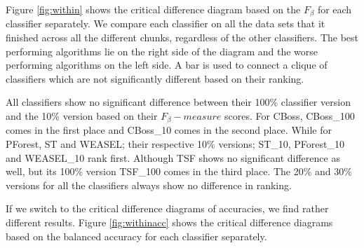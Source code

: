 Figure \ref{fig:within} shows the critical difference diagram based on the $F_{\beta}$ for each classifier separately.
We compare each classifier on all the data sets that it finished across all the different chunks, regardless of the other classifiers.
The best performing algorithms lie on the right side of the diagram and the worse performing algorithms on the left side.
A bar is used to connect a clique of classifiers which are not significantly different based on their ranking. 

All classifiers show no significant difference between their 100\% classifier version and the 10\% version based on their $F_{\beta}-measure$ scores.
For CBoss, CBoss\_100 comes in the first place and CBoss\_10 comes in the second place. While for PForest, ST and WEASEL;
their respective 10\% versions; ST\_10, PForest\_10 and WEASEL\_10 rank first.
Although TSF shows no significant difference as well, but its 100\% version TSF\_100 comes in the third place.
The 20\% and 30\% versions for all the classifiers always show no difference in ranking.

If we switch to the critical difference diagrams of accuracies, we find rather different results.
Figure \ref{fig:withinacc} shows the critical difference diagrams based on the balanced accuracy for each classifier separately.

